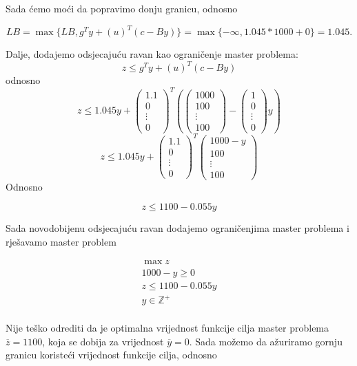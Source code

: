 \documentclass[a4paper, utf8, 11pt, colorlinks]{book}
\theoremstyle{definition}
\begin{document}
Sada ćemo moći da popravimo donju granicu, odnosno

$$LB = \max\{LB,g^Ty+(u)^T(c-By)\}=\max\{-\infty,1.045*1000+0\} = 1.045.$$

Dalje, dodajemo odsjecajuću ravan kao ograničenje master problema:
$$z\leqslant g^Ty+(u)^T(c-By)$$ 
odnosno
$$z\leqslant 1.045y+\left(\begin{array}{c}
	1.1 \\
	0 \\
	\vdots \\
	0
\end{array}\right)^T
\left(\left(\begin{array}{c}
	1000 \\
	100 \\
	\vdots \\
	100
\end{array}\right)-\left(\begin{array}{c}
1 \\
0 \\
\vdots \\
0
\end{array}\right)y\right)$$
$$z\leqslant 1.045y+\left(\begin{array}{c}
	1.1 \\
	0 \\
	\vdots \\
	0
\end{array}\right)^T
\left(\begin{array}{c}
	1000-y \\
	100 \\
	\vdots \\
	100
\end{array}\right)$$
Odnosno

$$z\leqslant 1100-0.055y$$

Sada novodobijenu odsjecajuću ravan dodajemo ograničenjima master problema i rješavamo master problem

$$
\begin{aligned}
	\max z\\
	1000-y\geqslant 0\\
	z\leqslant 1100-0.055y\\ 
	y\in\mathbb{Z}^+\\	
\end{aligned}
$$

Nije teško odrediti da je optimalna vrijednost funkcije cilja master problema $\overline{z}=1100$, koja se dobija za vrijednost $\overline{y}=0$.
Sada možemo da ažuriramo gornju granicu koristeći vrijednost funkcije cilja, odnosno
\end{document}
